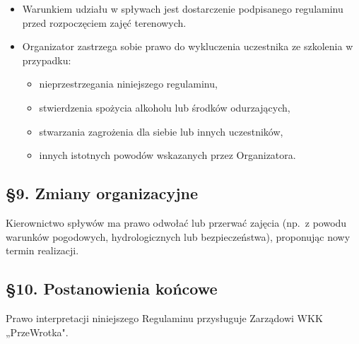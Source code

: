 \begin{itemize}[leftmargin=1.5em, itemsep=2pt]
  \item Warunkiem udziału w spływach jest dostarczenie podpisanego regulaminu przed
    rozpoczęciem zajęć terenowych.
  \item Organizator zastrzega sobie prawo do wykluczenia uczestnika ze szkolenia
    w przypadku:
    \begin{itemize}[leftmargin=1.5em, itemsep=1pt]
      \item nieprzestrzegania niniejszego regulaminu,
      \item stwierdzenia spożycia alkoholu lub środków odurzających,
      \item stwarzania zagrożenia dla siebie lub innych uczestników,
      \item innych istotnych powodów wskazanych przez Organizatora.
    \end{itemize}
\end{itemize}

\subsection*{§9. Zmiany organizacyjne}

Kierownictwo spływów ma prawo odwołać lub przerwać zajęcia (np.\ z powodu warunków
pogodowych, hydrologicznych lub bezpieczeństwa), proponując nowy termin realizacji.

\subsection*{§10. Postanowienia końcowe}

Prawo interpretacji niniejszego Regulaminu przysługuje Zarządowi WKK „PrzeWrotka".

\vspace{2cm}
\noindent
